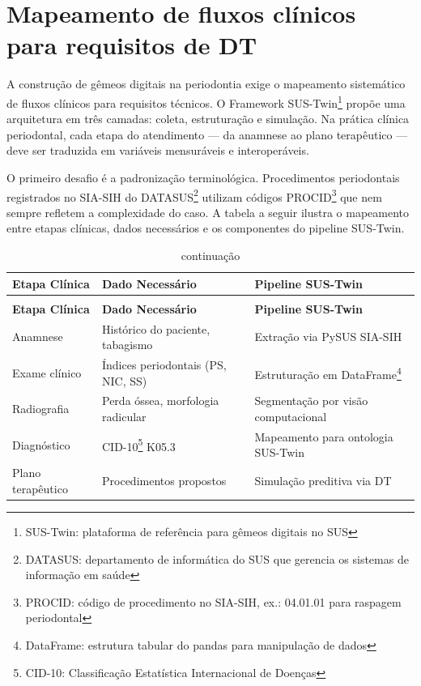 

\label{sec:panorama}

\section{Mapeamento de fluxos clínicos para requisitos de DT}

A construção de gêmeos digitais na periodontia exige o mapeamento sistemático de fluxos clínicos para requisitos técnicos. O Framework SUS-Twin{\footnote{SUS-Twin: plataforma de referência para gêmeos digitais no SUS}} propõe uma arquitetura em três camadas: coleta, estruturação e simulação. Na prática clínica periodontal, cada etapa do atendimento --- da anamnese ao plano terapêutico --- deve ser traduzida em variáveis mensuráveis e interoperáveis.

O primeiro desafio é a padronização terminológica. Procedimentos periodontais registrados no SIA-SIH do DATASUS{\footnote{DATASUS: departamento de informática do SUS que gerencia os sistemas de informação em saúde}} utilizam códigos PROCID{\footnote{PROCID: código de procedimento no SIA-SIH, ex.: 04.01.01 para raspagem periodontal}} que nem sempre refletem a complexidade do caso. A tabela a seguir ilustra o mapeamento entre etapas clínicas, dados necessários e os componentes do pipeline SUS-Twin.

\begin{longtable}{p{4cm}p{4.5cm}p{5.5cm}}
\caption{Mapeamento de etapas clínicas para o pipeline SUS-Twin} \\
\toprule
\textbf{Etapa Clínica} & \textbf{Dado Necessário} & \textbf{Pipeline SUS-Twin} \\
\midrule
\endfirsthead
\caption[]{continuação} \\
\toprule
\textbf{Etapa Clínica} & \textbf{Dado Necessário} & \textbf{Pipeline SUS-Twin} \\
\midrule
\endhead
\bottomrule
\endfoot
Anamnese & Histórico do paciente, tabagismo & Extração via PySUS SIA-SIH \\
Exame clínico & Índices periodontais (PS, NIC, SS) & Estruturação em DataFrame{\footnote{DataFrame: estrutura tabular do pandas para manipulação de dados}} \\
Radiografia & Perda óssea, morfologia radicular & Segmentação por visão computacional \\
Diagnóstico & CID-10{\footnote{CID-10: Classificação Estatística Internacional de Doenças}} K05.3 & Mapeamento para ontologia SUS-Twin \\
Plano terapêutico & Procedimentos propostos & Simulação preditiva via DT \\
\end{longtable}

